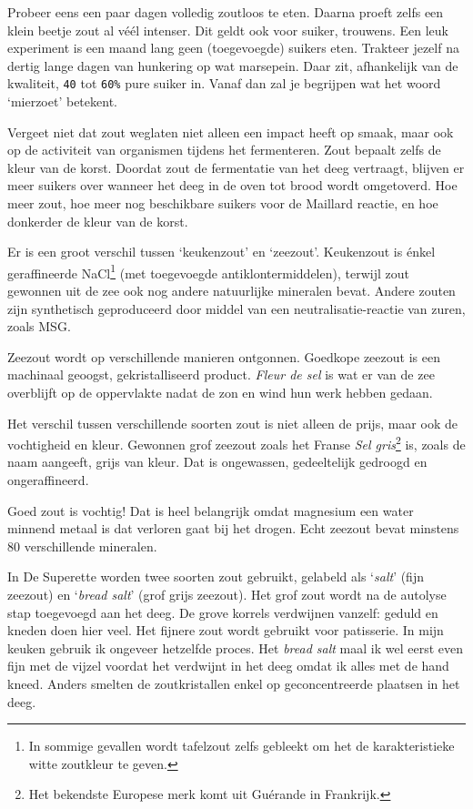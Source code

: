 \documentclass[
  11pt,
  dutch,
]{memoir}
\begin{document}
Probeer eens een paar dagen volledig zoutloos te eten. Daarna proeft
zelfs een klein beetje zout al véél intenser. Dit geldt ook voor suiker,
trouwens. Een leuk experiment is een maand lang geen (toegevoegde)
suikers eten. Trakteer jezelf na dertig lange dagen van hunkering op wat
marsepein. Daar zit, afhankelijk van de kwaliteit, \texttt{40} tot
\texttt{60\%} pure suiker in. Vanaf dan zal je begrijpen wat het woord
`mierzoet' betekent.

Vergeet niet dat zout weglaten niet alleen een impact heeft op smaak,
maar ook op de activiteit van organismen tijdens het fermenteren. Zout
bepaalt zelfs de kleur van de korst. Doordat zout de fermentatie van het
deeg vertraagt, blijven er meer suikers over wanneer het deeg in de oven
tot brood wordt omgetoverd. Hoe meer zout, hoe meer nog beschikbare
suikers voor de Maillard reactie, en hoe donkerder de kleur van de
korst.

Er is een groot verschil tussen `keukenzout' en `zeezout'. Keukenzout is
énkel geraffineerde NaCl\footnote{In sommige gevallen wordt tafelzout
  zelfs gebleekt om het de karakteristieke witte zoutkleur te geven.}
(met toegevoegde antiklontermiddelen), terwijl zout gewonnen uit de zee
ook nog andere natuurlijke mineralen bevat. Andere zouten zijn
synthetisch geproduceerd door middel van een neutralisatie-reactie van
zuren, zoals MSG.

Zeezout wordt op verschillende manieren ontgonnen. Goedkope zeezout is
een machinaal geoogst, gekristalliseerd product. \emph{Fleur de sel} is
wat er van de zee overblijft op de oppervlakte nadat de zon en wind hun
werk hebben gedaan.

Het verschil tussen verschillende soorten zout is niet alleen de prijs,
maar ook de vochtigheid en kleur. Gewonnen grof zeezout zoals het Franse
\emph{Sel gris}\footnote{Het bekendste Europese merk komt uit Guérande
  in Frankrijk.} is, zoals de naam aangeeft, grijs van kleur. Dat is
ongewassen, gedeeltelijk gedroogd en ongeraffineerd.

Goed zout is vochtig! Dat is heel belangrijk omdat magnesium een water
minnend metaal is dat verloren gaat bij het drogen. Echt zeezout bevat
minstens 80 verschillende mineralen.

In De Superette worden twee soorten zout gebruikt, gelabeld als
`\emph{salt}' (fijn zeezout) en `\emph{bread salt}' (grof grijs
zeezout). Het grof zout wordt na de autolyse stap toegevoegd aan het
deeg. De grove korrels verdwijnen vanzelf: geduld en kneden doen hier
veel. Het fijnere zout wordt gebruikt voor patisserie. In mijn keuken
gebruik ik ongeveer hetzelfde proces. Het \emph{bread salt} maal ik wel
eerst even fijn met de vijzel voordat het verdwijnt in het deeg omdat ik
alles met de hand kneed. Anders smelten de zoutkristallen enkel op
geconcentreerde plaatsen in het deeg.
\end{document}
